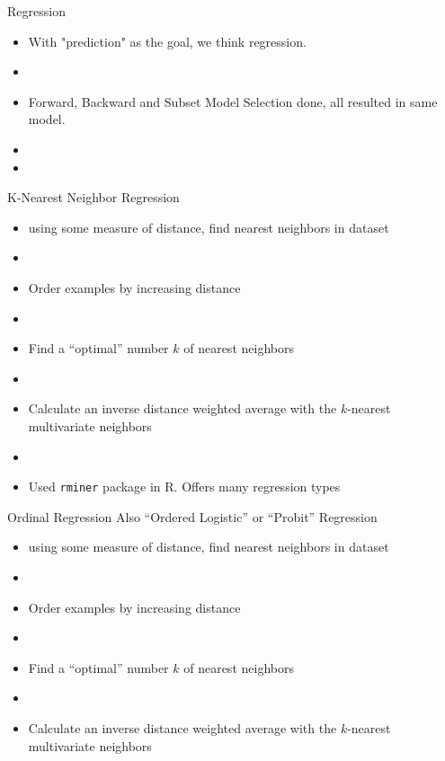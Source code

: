 \documentclass{beamer}
\begin{document}
\begin{frame}{Regression}
	\begin{itemize}
	\item With "prediction" as the goal, we think regression.
	\item[]
	\item Forward, Backward and Subset Model Selection done, all resulted in same model.
	\item[]
	\item 
	
	\end{itemize}
\end{frame}



\begin{frame}{K-Nearest Neighbor Regression}
	\begin{itemize}
	\item using some measure of distance, find nearest neighbors in dataset
	\item[]
	\item Order examples by increasing distance
	\item[]
	\item Find a ``optimal'' number $k$ of nearest neighbors
	\item[]
	\item Calculate an inverse distance weighted average with the $k$-nearest multivariate neighbors
	\item[]
	\item Used \texttt{rminer} package in R. Offers many regression types 
	\end{itemize}
\end{frame}


\begin{frame}{Ordinal Regression}
	Also ``Ordered Logistic'' or ``Probit'' Regression
	\begin{itemize}
	\item using some measure of distance, find nearest neighbors in dataset
	\item[]
	\item Order examples by increasing distance
	\item[]
	\item Find a ``optimal'' number $k$ of nearest neighbors
	\item[]
	\item Calculate an inverse distance weighted average with the $k$-nearest multivariate neighbors
	\end{itemize}
\end{frame}
\end{document}
